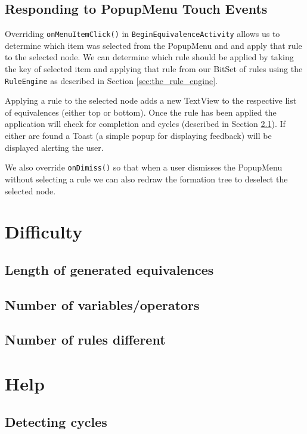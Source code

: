 \documentclass{report}
\begin{document}
\subsection{Responding to PopupMenu Touch Events}
\label{sub:responding_to_popupmenu_touch_events}

Overriding {\tt onMenuItemClick()} in {\tt BeginEquivalenceActivity} allows us to determine which item was selected from the PopupMenu and and apply that rule to the selected node. We can determine which rule should be applied by taking the key of selected item and applying that rule from our BitSet of rules using the {\tt RuleEngine} as described in Section \ref{sec:the_rule_engine}.

Applying a rule to the selected node adds a new TextView to the respective list of equivalences (either top or bottom). Once the rule has been applied the application will check for completion and cycles (described in Section \ref{sub:detecting_cycles}). If either are found a Toast (a simple popup for displaying feedback) will be displayed alerting the user.

We also override {\tt onDimiss()} so that when a user dismisses the PopupMenu without selecting a rule we can also redraw the formation tree to deselect the selected node. 

\section{Difficulty}
\subsection{Length of generated equivalences}
\subsection{Number of variables/operators}
\subsection{Number of rules different}

\section{Help}
\subsection{Detecting cycles}
\label{sub:detecting_cycles}
\end{document}
